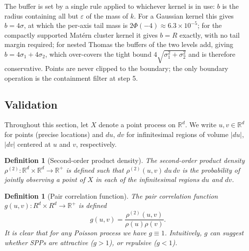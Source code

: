 \documentclass[11pt,letterpaper]{article}
\newcommand{\R}{\mathbb{R}}
\newcommand{\1}{\mathds{1}}
\theoremstyle{plain}
\theoremstyle{definitioncolon}
\newtheorem{definition}[theorem]{Definition}
\begin{document}
The buffer is set by a single rule applied to whichever kernel is in use: $b$ is
the radius containing all but $\varepsilon$ of the mass of $k$. For a Gaussian
kernel this gives $b = 4\sigma$, at which the per-axis tail mass is
$2\Phi(-4) \approx 6.3 \times 10^{-5}$; for the compactly supported Mat\'ern
cluster kernel it gives $b = R$ exactly, with no tail margin required; for nested
Thomas the buffers of the two levels add, giving $b = 4\sigma_1 + 4\sigma_2$,
which over-covers the tight bound $4\sqrt{\sigma_1^2 + \sigma_2^2}$ and is
therefore conservative. Points are never clipped to the boundary; the only
boundary operation is the containment filter at step 5.

\subsection{Validation}
\label{ssec:verification}
%

Throughout this section, let $X$ denote a point process on $\R^d$. We write
$u, v \in \R^d$ for points (precise locations) and $du$, $dv$ for infinitesimal
regions of volume $|du|$, $|dv|$ centered at $u$ and $v$, respectively.

    \begin{definition}[Second-order product density]
        The second-order product density
        $\rho^{(2)}: \R^d \times \R^d \rightarrow \R^+$
        is defined such that $\rho^{(2)}(u, v)\,du\,dv$ is the probability of
        jointly observing a point of $X$ in each of the infinitesimal regions
        $du$ and $dv$.
    \end{definition}

    \begin{definition}[Pair correlation function]
        The pair correlation function $g(u, v): R^d \times R^d \rightarrow \R^+$
        is defined
        \[
        g(u, v) = \frac{\rho^{(2)}(u, v)}{\rho(u)\rho(v)}.
        \]
    It is clear that for any Poisson process we have $g \equiv 1$. Intuitively,
    $g$ can suggest whether SPPs are attractive ($g > 1$), or repulsive
    ($g < 1$).
    \end{definition}
\end{document}
